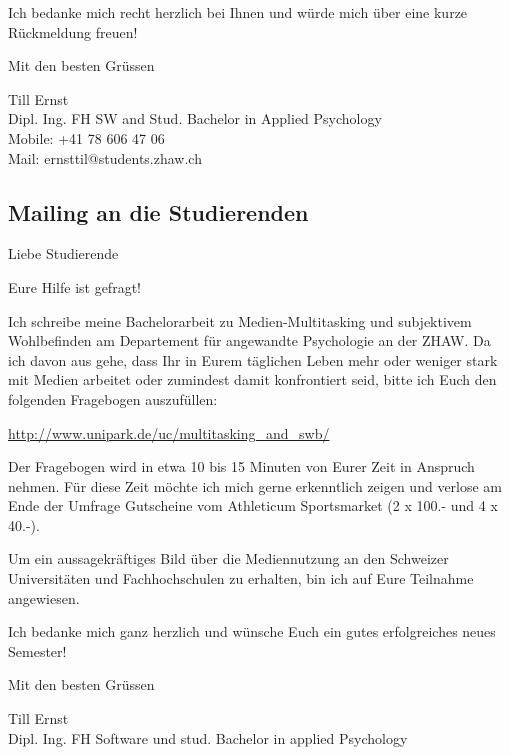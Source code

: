 Ich bedanke mich recht herzlich bei Ihnen und würde mich über eine kurze Rückmeldung freuen!

Mit den besten Grüssen

Till Ernst\\
Dipl. Ing. FH SW and Stud. Bachelor in Applied Psychology\\
Mobile: +41 78 606 47 06\\
Mail:  ernsttil@students.zhaw.ch 

\subsection{Mailing an die Studierenden}
Liebe Studierende

Eure Hilfe ist gefragt!

Ich schreibe meine Bachelorarbeit zu Medien-Multitasking und subjektivem Wohlbefinden am Departement für angewandte Psychologie an der ZHAW. Da ich davon aus gehe, dass Ihr in Eurem täglichen Leben mehr oder weniger stark mit Medien arbeitet oder zumindest damit konfrontiert seid, bitte ich Euch den folgenden Fragebogen auszufüllen:

\url{http://www.unipark.de/uc/multitasking_and_swb/}

Der Fragebogen wird in etwa 10 bis 15 Minuten von Eurer Zeit in Anspruch nehmen. Für diese Zeit möchte ich mich gerne erkenntlich zeigen und verlose am Ende der Umfrage Gutscheine vom Athleticum Sportsmarket (2 x 100.- und 4 x 40.-).

Um ein aussagekräftiges Bild über die Mediennutzung an den Schweizer Universitäten und Fachhochschulen zu erhalten, bin ich auf Eure Teilnahme angewiesen.

Ich bedanke mich ganz herzlich und wünsche Euch ein gutes erfolgreiches neues Semester!

Mit den besten Grüssen

Till Ernst\\
Dipl. Ing. FH Software und stud. Bachelor in applied Psychology

